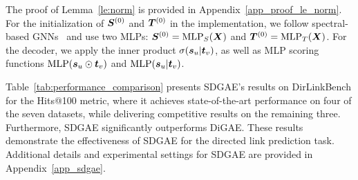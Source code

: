 The proof of Lemma~\ref{le:norm} is provided in Appendix~\ref{app_proof_le_norm}. For the initialization of ${\bm{S}}^{(0)}$ and ${\bm{T}}^{(0)}$ in the implementation, we follow spectral-based GNNs~\cite{gprgnn} and use two MLPs: ${\bm{S}}^{(0)} = \mathrm{MLP}_S({\bm{X}})$ and ${\bm{T}}^{(0)} = \mathrm{MLP}_T({\bm{X}})$. For the decoder, we apply the inner product $\sigma({\bm{s}}_u | {\bm{t}}_v)$, as well as MLP scoring functions $\mathrm{MLP}({\bm{s}}_u \odot {\bm{t}}_v)$ and $\mathrm{MLP}({\bm{s}}_u | {\bm{t}}_v)$.

Table~\ref{tab:performance_comparison} presents SDGAE's results on DirLinkBench for the Hits@100 metric, where it achieves state-of-the-art performance on four of the seven datasets, while delivering competitive results on the remaining three. Furthermore, SDGAE significantly outperforms DiGAE. These results demonstrate the effectiveness of SDGAE for the directed link prediction task. Additional details and experimental settings for SDGAE are provided in Appendix~\ref{app_sdgae}.











